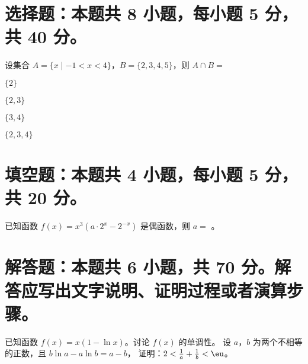 \section{选择题：本题共 8 小题，每小题 5 分，共 40 分。}

\begin{question}
  设集合 $A = \{x \mid -1 < x < 4\}$，$B = \{2, 3, 4, 5\}$，则 $A \cap B = $ \paren
  \begin{choices}
    \item $\{2\}$
    \item $\{2, 3\}$
    \item $\{3, 4\}$
    \item $\{2, 3, 4\}$
  \end{choices}
\end{question}

\section{填空题：本题共 4 小题，每小题 5 分，共 20 分。}

\begin{question}
  已知函数 $f(x) = x^3 (a \cdot 2^x - 2^{-x})$ 是偶函数，则 $a = $ \fillin 。
\end{question}

\section{解答题：本题共 6 小题，共 70 分。解答应写出文字说明、证明过程或者演算步骤。}

\begin{problem}[points = 12]
  已知函数 $f(x) = x (1 - \ln x)$。讨论 $f(x)$ 的单调性。
  设 $a$，$b$ 为两个不相等的正数，且 $b \ln a - a \ln b = a - b$，
  证明：$2 < \frac{1}{a} + \frac{1}{b} < \eu$。
\end{problem}